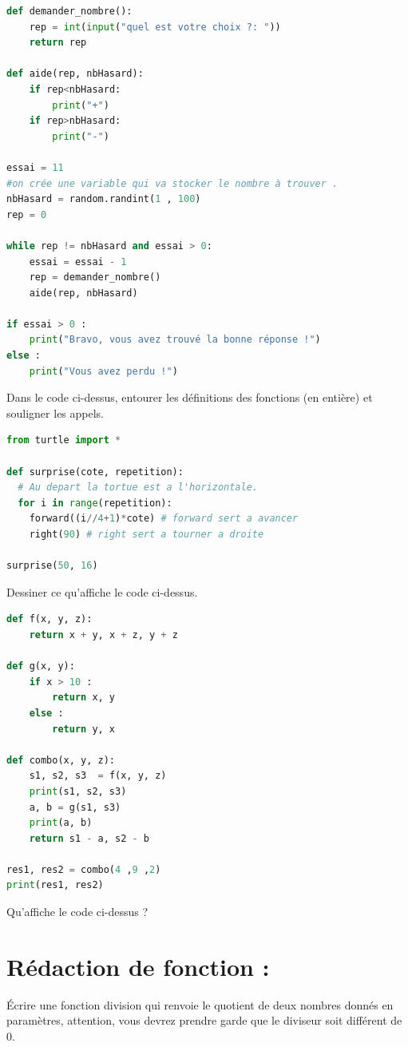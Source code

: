 \documentclass[a4paper, noanswers, addpoints, 12pt]{exam}
\begin{document}
\begin{questions}
\begin{lstlisting}[style=mystyle, language=Python]
def demander_nombre():
    rep = int(input("quel est votre choix ?: "))
    return rep

def aide(rep, nbHasard):
    if rep<nbHasard:
        print("+")
    if rep>nbHasard:
        print("-")
        
essai = 11
#on crée une variable qui va stocker le nombre à trouver .
nbHasard = random.randint(1 , 100)
rep = 0

while rep != nbHasard and essai > 0:
    essai = essai - 1
    rep = demander_nombre()
    aide(rep, nbHasard)

if essai > 0 :
    print("Bravo, vous avez trouvé la bonne réponse !")
else :
    print("Vous avez perdu !")
\end{lstlisting}
\question[3] Dans le code ci-dessus, entourer les définitions des fonctions (en entière) et souligner les appels.

\begin{lstlisting}[style=mystyle, language=Python]
from turtle import *

def surprise(cote, repetition):
  # Au depart la tortue est a l'horizontale.
  for i in range(repetition):
    forward((i//4+1)*cote) # forward sert a avancer
    right(90) # right sert a tourner a droite

surprise(50, 16)
\end{lstlisting}
\question[2] Dessiner ce qu'affiche le code ci-dessus. 

\begin{lstlisting}[style=mystyle, language=Python]
def f(x, y, z):
    return x + y, x + z, y + z

def g(x, y):
    if x > 10 :
        return x, y
    else :
        return y, x

def combo(x, y, z):
    s1, s2, s3  = f(x, y, z)
    print(s1, s2, s3)
    a, b = g(s1, s3)
    print(a, b)
    return s1 - a, s2 - b 

res1, res2 = combo(4 ,9 ,2)
print(res1, res2)
\end{lstlisting}
\question[3] Qu'affiche le code ci-dessus ?\\

\section{Rédaction de fonction :}
\question[2] Écrire une fonction division qui renvoie le quotient de deux nombres donnés en paramètres, attention, vous devrez prendre garde que le diviseur soit différent de 0.
\end{questions}
\end{document}
